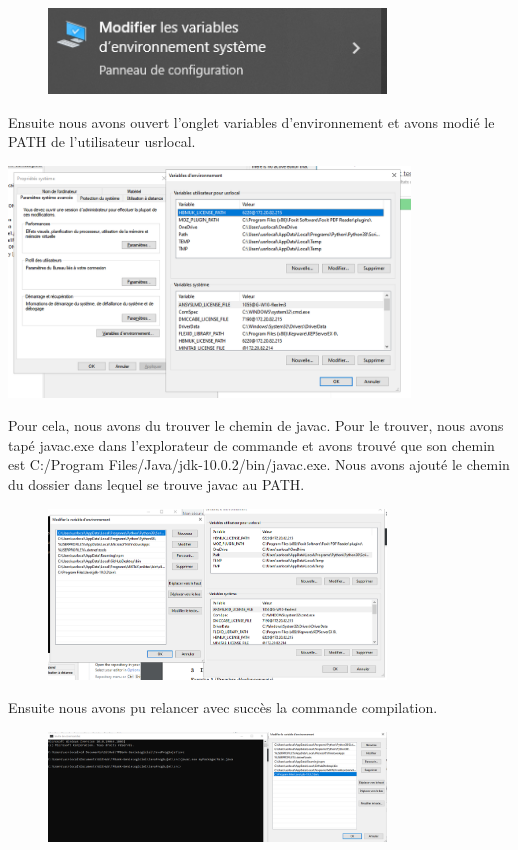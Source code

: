 \documentclass{article}
\begin{document}
\begin{figure}[h]
\includegraphics[width=0.8\textwidth]{Annotation 2023-01-10 143053.png}
\end{figure}

Ensuite nous avons ouvert l'onglet variables d'environnement et avons modié le PATH de l'utilisateur usrlocal.

\includegraphics[width=0.8\textwidth]{Annotation 2023-01-10 143100.png}


Pour cela, nous avons du trouver le chemin de javac. Pour le trouver, nous avons tapé javac.exe dans l'explorateur de commande et avons trouvé que son chemin est C:/Program Files/Java/jdk-10.0.2/bin/javac.exe.
Nous avons ajouté le chemin du dossier dans lequel se trouve javac au PATH.


\begin{figure}[h]
\includegraphics[width=0.8\textwidth]{Annotation 2023-01-10 145746.png}
\end{figure}
Ensuite nous avons pu relancer avec succès la commande compilation.
\begin{figure}[h]
\includegraphics[width=0.8\textwidth]{Annotation 2023-01-10 145813.png}
\end{figure}
\end{document}

